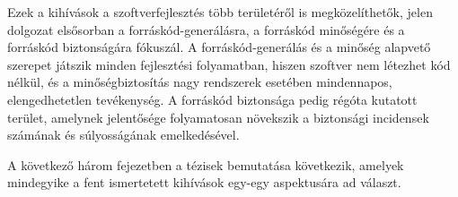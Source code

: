 \documentclass[12pt,a4paper]{extarticle}
\begin{document}
Ezek a kihívások a szoftverfejlesztés több területéről is megközelíthetők, jelen dolgozat elsősorban a forráskód-generálásra, a forráskód minőségére és a forráskód biztonságára fókuszál.
A forráskód-generálás és a minőség alapvető szerepet játszik minden fejlesztési folyamatban, hiszen szoftver nem létezhet kód nélkül, és a minőségbiztosítás nagy rend\-sze\-rek esetében mindennapos, elengedhetetlen tevékenység.
A forráskód biztonsága pedig régóta kutatott terület, amelynek jelentősége folyamatosan növekszik a biztonsági incidensek számának és súlyosságának emelkedésével.

A következő három fejezetben a tézisek bemutatása következik, amelyek mindegyike a fent ismertetett kihívások egy-egy aspektusára ad választ.


\section{\thesispointonehu}
\end{document}
